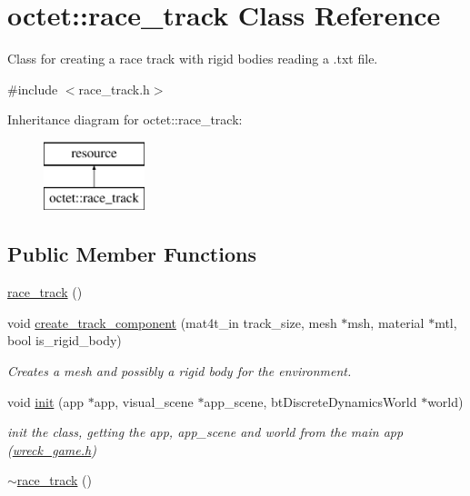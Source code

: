\hypertarget{classoctet_1_1race__track}{\section{octet\+:\+:race\+\_\+track Class Reference}
\label{classoctet_1_1race__track}
}


Class for creating a race track with rigid bodies reading a .txt file.  




{\ttfamily \#include $<$race\+\_\+track.\+h$>$}

Inheritance diagram for octet\+:\+:race\+\_\+track\+:\begin{figure}[H]
\begin{center}
\leavevmode
\includegraphics[height=2.000000cm]{classoctet_1_1race__track}
\end{center}
\end{figure}
\subsection*{Public Member Functions}
\begin{DoxyCompactItemize}
\item 
\hyperlink{classoctet_1_1race__track_ac4cd9e5f3cd700178c00a09c2b21445f}{race\+\_\+track} ()
\item 
void \hyperlink{classoctet_1_1race__track_ab2c04a779a0d94e7c91895de318d1314}{create\+\_\+track\+\_\+component} (mat4t\+\_\+in track\+\_\+size, mesh $\ast$msh, material $\ast$mtl, bool is\+\_\+rigid\+\_\+body)
\begin{DoxyCompactList}\small\item\em Creates a mesh and possibly a rigid body for the environment. \end{DoxyCompactList}\item 
void \hyperlink{classoctet_1_1race__track_a3d6bf1d245f23564eb8eb3b36ac463b5}{init} (app $\ast$app, visual\+\_\+scene $\ast$app\+\_\+scene, bt\+Discrete\+Dynamics\+World $\ast$world)
\begin{DoxyCompactList}\small\item\em init the class, getting the app, app\+\_\+scene and world from the main app (\hyperlink{wreck__game_8h}{wreck\+\_\+game.\+h}) \end{DoxyCompactList}\item 
\hyperlink{classoctet_1_1race__track_a03aceb6117388e72ee9cb8da2bcdd4eb}{$\sim$race\+\_\+track} ()
\end{DoxyCompactItemize}


